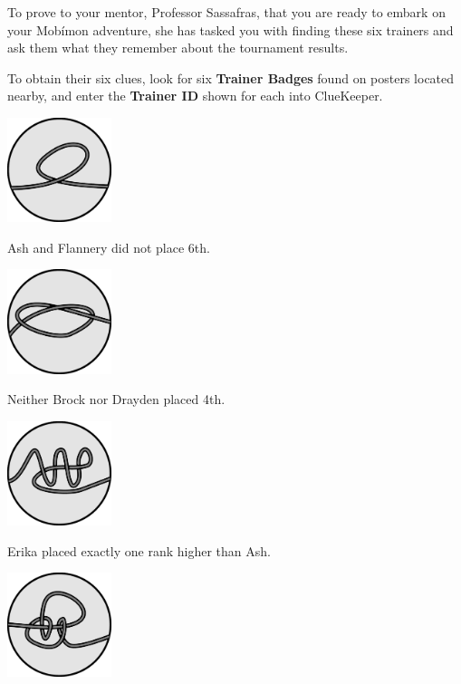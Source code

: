 \documentclass{puzzlehunt}
\begin{document}
To prove to your mentor, Professor Sassafras, that you are ready to embark on your Mob\'imon adventure, she has tasked you with finding these six trainers and ask them what they remember about the tournament results.

To obtain their six clues, look for six \textbf{Trainer Badges} found on posters located nearby, and enter the \textbf{Trainer ID} shown for each into ClueKeeper.

\vfill


\begin{multicols}{3}\footnotesize
  \begin{center}
    \includegraphics[width=1.2in]{assets/unknot1.pdf}

    Ash and Flannery did not place 6th.


    \includegraphics[width=1.2in]{assets/knot1.pdf}

    Neither Brock nor Drayden placed 4th.


    \includegraphics[width=1.2in]{assets/unknot2.pdf}

    Erika placed exactly one rank higher than Ash.


    \includegraphics[width=1.2in]{assets/knot2.pdf}


\end{center}
\end{multicols}
\end{document}

